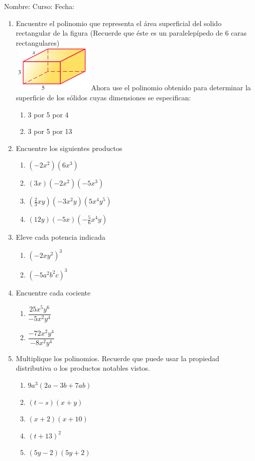 \documentclass[letterpaper,fleqn]{article}
\newcommand{\LineaNombre}{%
\par
\vspace{\baselineskip}
Nombre:\hrulefill \; Curso: \underline{\hspace*{48pt}} \; Fecha: \underline{\hspace*{2.5cm}} \relax
\par}
\begin{document}
\LineaNombre
\begin{enumerate}
 \item Encuentre el polinomio que representa el área superficial del solido rectangular de la figura (Recuerde que \'{e}ste es un paralelep\'{i}pedo de 6 caras rectangulares)\\
\includegraphics[scale=1]{Images/solido01.png} 
\noanswer
Ahora use el polinomio obtenido para determinar la superficie de los sólidos cuyas dimensiones se especifican:
\begin{enumerate}
\item 3 por 5 por 4\noanswer
\item 3 por 5 por 13\noanswer
\end{enumerate}
\item Encuentre los siguientes productos
\begin{enumerate}
\item $(-2x^{2})(6x^{3})$\noanswer
\item $(3x)(-2x^{2})(-5x^{3})$\noanswer
\item $(\frac{2}{3}xy)(-3x^{2}y)(5x^{4}y^{5})$\noanswer
\item $(12y)(-5x)(-\frac{5}{6}x^{4}y)$\noanswer
\end{enumerate}
\item Eleve cada potencia indicada
\begin{enumerate}
\item $(-2xy^{2})^{3}$\noanswer
\item $(-5a^{2}b^{2}c)^{3}$\noanswer
\end{enumerate}
\item Encuentre cada cociente
\begin{enumerate}
\item $\dfrac{25x^{5}y^{6}}{-5x^{2}y^{4}}$\noanswer
\item $\dfrac{-72x^{2}y^{4}}{-8x^{2}y^{4}}$\noanswer
\end{enumerate}
\item Multiplique los polinomios. Recuerde que puede usar la propiedad distributiva o los productos notables vistos.
\begin{enumerate}
\item $9a^{3}(2a-3b+7ab)$\noanswer
\item $(t-s)(x+y)$\noanswer
\item $(x+2)(x+10)$\noanswer
\item $(t+13)^{2}$\noanswer
\item $(5y-2)(5y+2)$\noanswer
\end{enumerate}
 \end{enumerate}
\end{document}
